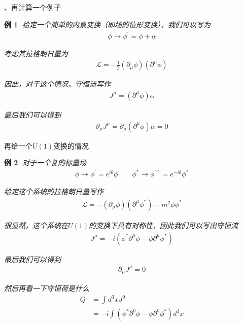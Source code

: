\documentclass{article}
\newtheorem{example}{例}
\begin{document}
、再计算一个例子
\begin{example}
    给定一个简单的内禀变换（即场的位形变换），我们可以写为
    \begin{align*}
        \phi\to\phi^\prime=\phi+\alpha
    \end{align*}

    考虑其拉格朗日量为
    \begin{align*}
        \mathcal{L}=-\frac{1}{2}(\partial_\mu\phi)(\partial^\mu\phi)
    \end{align*}

    因此，对于这个情况，守恒流写作
    \begin{align*}
        J^\mu=\left(\partial^\mu\phi\right)\alpha
    \end{align*}

    最后我们可以得到
    \begin{align*}
        \partial_\mu J^\mu=\partial_\mu\left(\partial^\mu\phi\right)\alpha=0
    \end{align*}
\end{example}

再给一个$U(1)$变换的情况
\begin{example}
    对于一个复的标量场
    \begin{align*}
        \phi\to\phi^\prime=e^{i\theta}\phi\quad\quad\phi^*\to\phi^{\prime*}=e^{-i\theta}\phi^*
    \end{align*}

    给定这个系统的拉格朗日量写作
    \begin{align*}
        \mathcal{L}=-(\partial_\mu\phi)(\partial^\mu\phi^*)-m^2\phi\phi^*
    \end{align*}

    很显然，这个系统在$U(1)$的变换下具有对称性，因此我们可以写出守恒流
    \begin{align*}
        J^\mu=-i\left(\phi^*\partial^\mu\phi-\phi\partial^\mu\phi^*\right)
    \end{align*}

    最后我们可以得到
    \begin{align*}
        \partial_\mu J^\mu=0
    \end{align*}

    然后再看一下守恒荷是什么
    \begin{align*}
        Q&=\int d^3x J^0\\
        &=-i\int \left(\phi^*\partial^0\phi-\phi\partial^0\phi^*\right)d^3x
    \end{align*}
\end{example}
\end{document}

